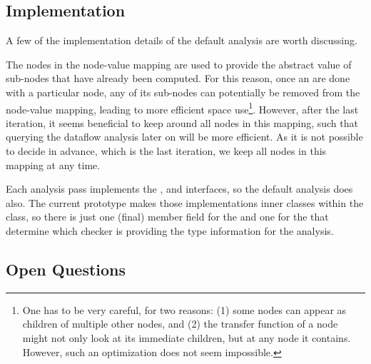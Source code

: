 \subsection{Implementation}

A few of the implementation details of the default analysis are worth discussing.


The nodes in the node-value mapping are used to provide the abstract value of sub-nodes
that have already been computed.  For this reason, once an are done with a particular node,
any of its sub-nodes can potentially be removed from the node-value mapping,
leading to more efficient space use\footnote{One has to be very careful, for two reasons: (1)
some nodes can appear as children of multiple other nodes, and (2) the transfer function of
a node might not only look at its immediate children, but at any node it contains.  However,
such an optimization does not seem impossible.}.
However, after the last iteration, it seems beneficial to keep around all nodes in this mapping,
such that querying the dataflow analysis later on will be more efficient.  As it is not
possible to decide in advance, which is the last iteration, we keep all nodes in this mapping
at any time.

Each analysis pass implements the ,  and 
 interfaces, so the
default analysis does also.  The current prototype makes those implementations inner
classes within the  class, so there is just one (final) member field
for the  and one for the  that determine 
which checker is providing the type information for the analysis.


\subsection{Open Questions}

